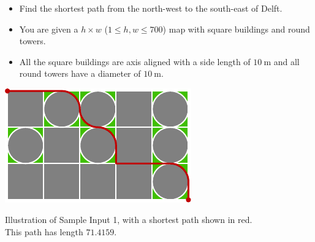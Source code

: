 \begin{frame}
    \frametitle{\problemtitle}

    \begin{columns}
        \begin{column}[T]{.70\textwidth}
            \begin{itemize}
                \item Find the shortest path from the north-west to the south-east of Delft.
                \item You are given a $h \times w$ ($1 \leq h,w \leq 700$) map with square buildings and round towers.
                \item All the square buildings are axis aligned with a side length of $10~\text{m}$ and all round towers have a diameter of $10~\text{m}$.
            \end{itemize}

            \vspace{1em}

            \centering
            \includegraphics{sample}

            \small
            Illustration of Sample Input 1, with a shortest path shown in red. \\
            This path has length $71.4159$.
        \end{column}

    \end{columns}
\end{frame}
